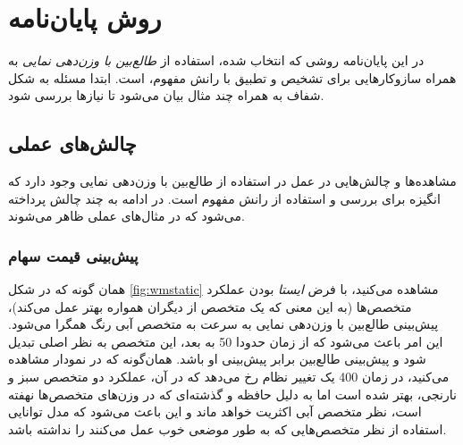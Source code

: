 

\section{
روش پایان‌نامه
}



در این پایان‌نامه روشی که انتخاب شده، استفاده از 
\textit{
طالع‌بین با وزن‌دهی نمایی
} 
به همراه سازوکارهایی برای تشخیص و تطبیق با رانش مفهوم، است. ابتدا مسئله به شکل شفاف به همراه چند مثال بیان می‌شود تا نیازها بررسی شود.

\subsection{
چالش‌های عملی
}

مشاهده‌ها و چالش‌هایی در عمل در استفاده از طالع‌بین با وزن‌دهی نمایی وجود دارد که انگیزه برای بررسی و استفاده از رانش مفهوم است. در ادامه به چند چالش پرداخته می‌شود که در مثال‌های عملی ظاهر می‌شوند.

\subsubsection{
پیش‌بینی قیمت سهام
}



همان گونه که در شکل 
\ref{fig:wmstatic} 
مشاهده می‌کنید، با فرض 
\textit{
ایستا
} 
بودن عملکرد متخصص‌ها (به این معنی که یک متخصص از دیگران همواره بهتر عمل می‌کند)، پیش‌بینی طالع‌بین با وزن‌دهی نمایی به سرعت به متخصص آبی رنگ همگرا می‌شود. این امر باعث می‌شود که از زمان حدودا 50 به بعد، این متخصص به نظر اصلی تبدیل شود و پیش‌بینی طالع‌بین برابر پیش‌بینی او باشد. همان‌گونه که در نمودار مشاهده می‌کنید، در زمان 400 یک تغییر نظام رخ می‌دهد که در آن، عملکرد دو متخصص سبز و نارنجی، بهتر شده است اما به دلیل حافظه و گذشته‌ای که در وزن‌های متخصص‌ها نهفته است، نظر متخصص آبی اکثریت خواهد ماند و این باعث می‌شود که مدل توانایی استفاده از نظر متخصص‌هایی که به طور موضعی خوب عمل می‌کنند را نداشته باشد.


